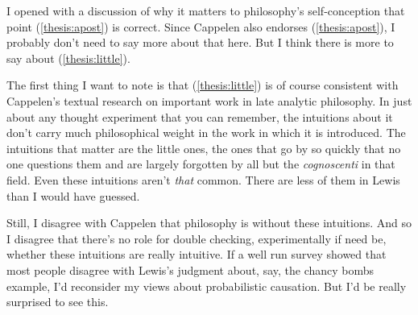 \noindent I opened with a discussion of why it matters to philosophy's self-conception that point (\ref{thesis:apost}) is correct. Since Cappelen also endorses  (\ref{thesis:apost}), I probably don't need to say more about that here. But I think there is more to say about (\ref{thesis:little}).

The first thing I want to note is that (\ref{thesis:little}) is of course consistent with Cappelen's textual research on important work in late analytic philosophy. In just about any thought experiment that you can remember, the intuitions about it don't carry much philosophical weight in the work in which it is introduced. The intuitions that matter are the little ones, the ones that go by so quickly that no one questions them and are largely forgotten by all but the \textit{cognoscenti} in that field. Even these intuitions aren't \textit{that} common. There are less of them in Lewis than I would have guessed.

Still, I disagree with Cappelen that philosophy is without these intuitions. And so I disagree that there's no role for double checking, experimentally if need be, whether these intuitions are really intuitive. If a well run survey showed that most people disagree with Lewis's judgment about, say, the chancy bombs example, I'd reconsider my views about probabilistic causation. But I'd be really surprised to see this.

